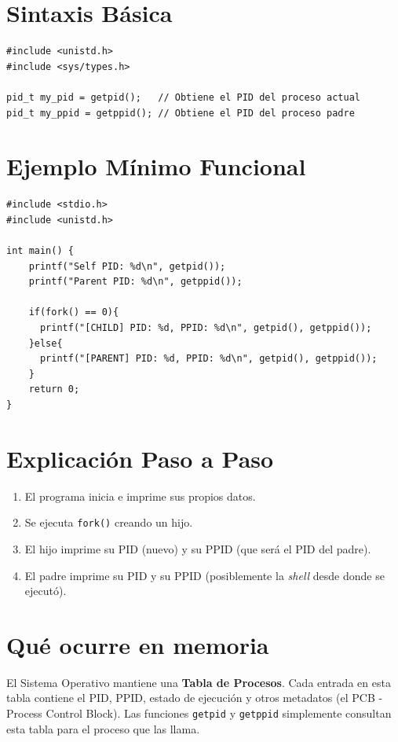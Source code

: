 \documentclass[12pt,a4paper]{article}
\begin{document}
\section{Sintaxis Básica}
\begin{lstlisting}[numbers=none]
#include <unistd.h>
#include <sys/types.h>

pid_t my_pid = getpid();   // Obtiene el PID del proceso actual
pid_t my_ppid = getppid(); // Obtiene el PID del proceso padre
\end{lstlisting}

\section{Ejemplo Mínimo Funcional}
\begin{lstlisting}
#include <stdio.h>
#include <unistd.h>

int main() {
    printf("Self PID: %d\n", getpid());
    printf("Parent PID: %d\n", getppid());

    if(fork() == 0){
      printf("[CHILD] PID: %d, PPID: %d\n", getpid(), getppid());
    }else{
      printf("[PARENT] PID: %d, PPID: %d\n", getpid(), getppid());
    }
    return 0;
}
\end{lstlisting}

\section{Explicación Paso a Paso}
\begin{enumerate}
    \item El programa inicia e imprime sus propios datos.
    \item Se ejecuta \texttt{fork()} creando un hijo.
    \item El hijo imprime su PID (nuevo) y su PPID (que será el PID del padre).
    \item El padre imprime su PID y su PPID (posiblemente la \textit{shell} desde donde se ejecutó).
\end{enumerate}

\section{Qué ocurre en memoria}
El Sistema Operativo mantiene una \textbf{Tabla de Procesos}. Cada entrada en esta tabla contiene el PID, PPID, estado de ejecución y otros metadatos (el PCB - Process Control Block). Las funciones \texttt{getpid} y \texttt{getppid} simplemente consultan esta tabla para el proceso que las llama.
\end{document}
